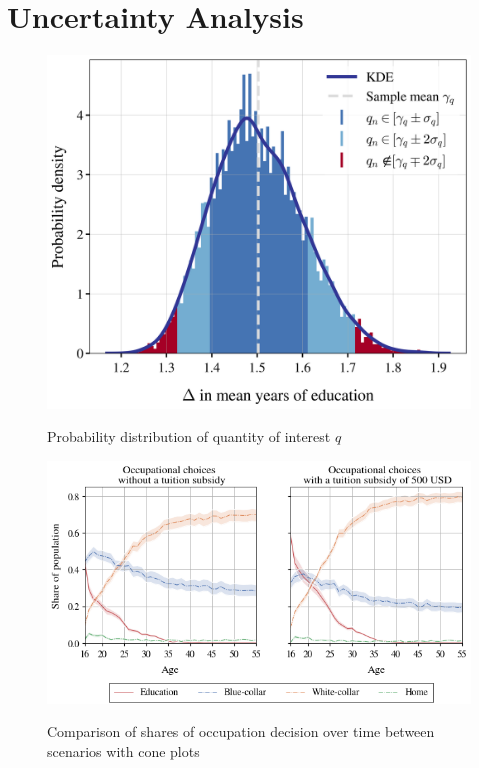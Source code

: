 \section{Uncertainty Analysis}
\thispagestyle{plain} %

\begin{figure}[H]
	\caption{Probability distribution of quantity of interest $q$}
	\centering
	\includegraphics[scale=0.7]{../scrypy/figures/distplot}
	\label{fig:dist}
\end{figure}

\begin{figure}[H]
	\caption{Comparison of shares of occupation decision over time between scenarios with cone plots}
	\centering
	\includegraphics[scale=0.75]{../scrypy/figures/cone_plot_choice_shares}
	\label{fig:paths}
\end{figure}


